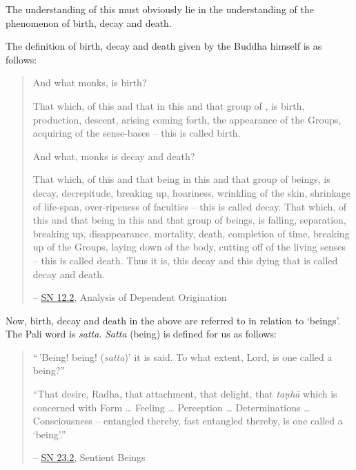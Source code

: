 The understanding of this must obviously lie in the understanding of the phenomenon of birth, decay and death.

The definition of birth, decay and death given by the Buddha himself is as follows:

\begin{quote}
And what monks, is birth?

That which, of this and that  in this and that group of , is birth, production, descent, arising coming forth, the appearance of the Groups, acquiring of the sense-bases -- this is called birth.

And what, monks is decay and death?

That which, of this and that being in this and that group of beings, is decay, decrepitude, breaking up, hoariness, wrinkling of the skin, shrinkage of life-span, over-ripeness of faculties -- this is called decay. That which, of this and that being in this and that group of beings, is falling, separation, breaking up, disappearance, mortality, death, completion of time, breaking up of the Groups, laying down of the body, cutting off of the living senses -- this is called death. Thus it is, this decay and this dying that is called decay and death.

 -- \href{https://suttacentral.net/sn12.2/en/bodhi}{SN 12.2}, Analysis of Dependent Origination
\end{quote}

Now, birth, decay and death in the above are referred to in relation to `beings'. The Pali word is \emph{satta}. \emph{Satta} (being) is defined for us as follows:

\begin{quote}
``\,'Being! being! (\emph{satta})' it is said. To what extent, Lord, is one called a being?''

``That desire, Radha, that attachment, that delight, that \emph{taṇhā} which is concerned with Form \ldots\hspace{0pt} Feeling \ldots\hspace{0pt} Perception \ldots\hspace{0pt} Determinations \ldots\hspace{0pt} Consciousness -- entangled thereby, fast entangled thereby,  is one called a `being'.''

 -- \href{https://suttacentral.net/sn23.2/en/sujato}{SN 23.2}, Sentient Beings
\end{quote}

